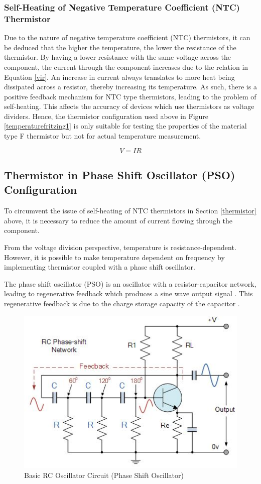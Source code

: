 \subsubsection{Self-Heating of Negative Temperature Coefficient (NTC) Thermistor}
Due to the nature of negative temperature coefficient (NTC) thermistors, it can be deduced that the higher the temperature, the lower the resistance of the thermistor. By having a lower resistance with the same voltage across the component, the current through the component increases due to the relation in Equation \ref{vir}. An increase in current always translates to more heat being dissipated across a resistor, thereby increasing its temperature. As such, there is a positive feedback mechanism for NTC type thermistors, leading to the problem of self-heating. This affects the accuracy of devices which use thermistors as voltage dividers. Hence, the thermistor configuration used above in Figure \ref{temperaturefritzing1} is only suitable for testing the properties of the material type F thermistor but not for actual temperature measurement.  

\begin{equation}
 V=IR
 \label{vir}
\end{equation} 

\subsection{Thermistor in Phase Shift Oscillator (PSO) Configuration}

To circumvent the issue of self-heating of NTC thermistors in Section \ref{thermistor} above, it is necessary to reduce the amount of current flowing through the component. 

From the voltage division perspective, temperature is resistance-dependent. However, it is possible to make temperature dependent on frequency by implementing thermistor coupled with a phase shift oscillator.  

The phase shift oscillator (PSO) is an oscillator with a resistor-capacitor network, leading to regenerative feedback which produces a sine wave output signal \cite{psotutorial}. This regenerative feedback is due to the charge storage capacity of the capacitor \cite{psotutorial}. 

\begin{figure}[H]
	\centering
	\includegraphics[width=0.6\linewidth]{psowebsite.jpg}
	\caption{Basic RC Oscillator Circuit (Phase Shift Oscillator) \cite{psotutorial}}
	\label{psowebsite}
\end{figure}

